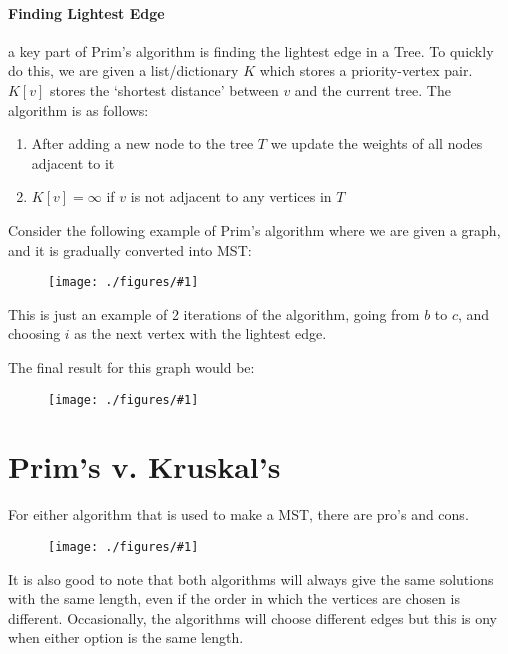 \documentclass[12pt]{book}
\newcommand{\incimg}[2]{%
       \begin{figure}[h]
               \centering
               \texttt{[image: ./figures/\#1]}
       \end{figure}
}
\begin{document}
\paragraph*{Finding Lightest Edge}
a key part of Prim's algorithm is finding the lightest edge in a Tree. To quickly do this, we are given a list/dictionary $K$ which stores
a priority-vertex pair. $K[v]$ stores the `shortest distance' between $v$ and the current tree. The algorithm is as follows:
\begin{enumerate}
        \item After adding a new node to the tree $T$ we update the weights of all nodes adjacent to it
        \item $K[v] = \infty$ if $v$ is not adjacent to any vertices in $T$
\end{enumerate}

Consider the following example of Prim's algorithm where we are given a graph, and it is gradually converted into
MST:
\incimg{example}{0.42}

This is just an example of 2 iterations of the algorithm, going from $b$ to $c$, and choosing $i$ as the next vertex with the 
lightest edge.

The final result for this graph would be:
\incimg{result}{0.55}
\pagebreak

\section*{Prim's v. Kruskal's}
For either algorithm that is used to make a MST, there are pro's and cons.
\incimg{PvK}{0.5}

It is also good to note that both algorithms will always give
the same solutions with the same length, even if the order in which
the vertices are chosen is different. Occasionally, the algorithms will
choose different edges but this is ony when either option is the same
length.
\end{document}
